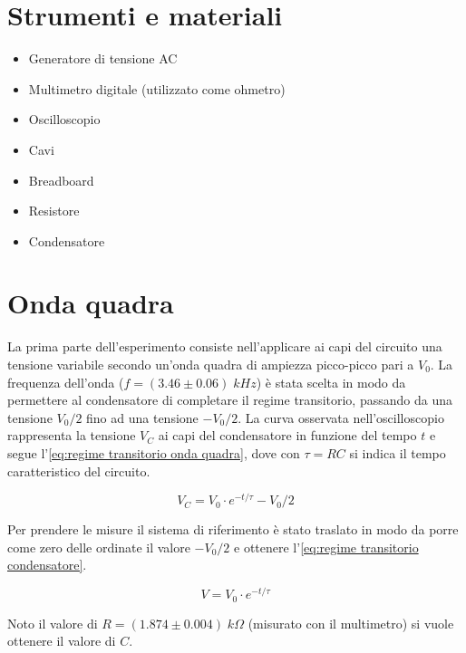 \documentclass[11pt, a4paper]{article}
\numberwithin{equation}{section} %
\begin{document}
\section{Strumenti e materiali}

\begin{itemize}
    \item Generatore di tensione AC
    \item Multimetro digitale (utilizzato come ohmetro)
    \item Oscilloscopio
    \item Cavi
    \item Breadboard
    \item Resistore
    \item Condensatore
\end{itemize}

\section{Onda quadra} \label{sec:onda quadra}

La prima parte dell'esperimento consiste nell'applicare ai capi del circuito una tensione variabile secondo un'onda quadra di ampiezza picco-picco pari a \(V_{0}\). La frequenza dell'onda ($f = (3.46 \pm 0.06) \; kHz$) è stata scelta in modo da permettere al condensatore di completare il regime transitorio, passando da una tensione \(V_{0}/2\) fino ad una tensione \(- V_{0}/2\). La curva osservata nell'oscilloscopio rappresenta la tensione \(V_{C}\) ai capi del condensatore in funzione del tempo \(t\) e segue l'\autoref{eq:regime transitorio onda quadra}, dove con $\tau = RC$ si indica il tempo caratteristico del circuito.

\begin{equation} \label{eq:regime transitorio onda quadra}
    V_{C} = V_{0} \cdot e^{-t/\tau} - V_{0}/2
\end{equation}

Per prendere le misure il sistema di riferimento è stato traslato in modo da porre come zero delle ordinate il valore \(- V_{0}/2\) e ottenere l'\autoref{eq:regime transitorio condensatore}.

\begin{equation} \label{eq:regime transitorio condensatore}
    V = V_{0} \cdot e^{-t/\tau}
\end{equation}

Noto il valore di \(R = (1.874 \pm 0.004) \; \unit{k\Omega}\) (misurato con il multimetro) si vuole ottenere il valore di \(C\).
\end{document}
